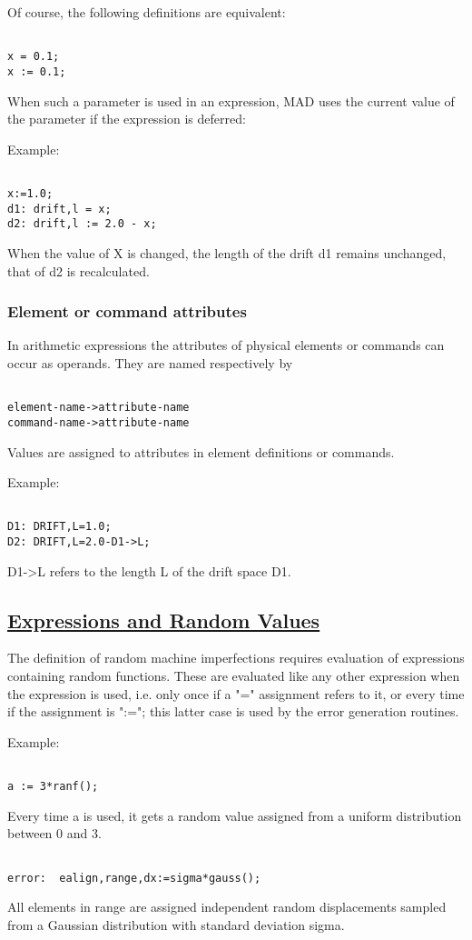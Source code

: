 Of course, the following definitions are equivalent:  
\begin{verbatim}

x = 0.1;
x := 0.1;
\end{verbatim}

When such a parameter is used in an expression, MAD uses the current
value of the parameter if the expression is deferred:  

Example: 
\begin{verbatim}

x:=1.0;
d1: drift,l = x;
d2: drift,l := 2.0 - x;
\end{verbatim} 
When the value of X is changed, the length of the drift d1 remains
unchanged, that of d2 is recalculated.   

\subsubsection{Element or command attributes} 
In arithmetic expressions the attributes of physical elements or
commands can occur as operands. They are named respectively by  
\begin{verbatim}

element-name->attribute-name
command-name->attribute-name
\end{verbatim} 

Values are assigned to attributes in element definitions or commands. 

Example: 
\begin{verbatim}

D1: DRIFT,L=1.0;
D2: DRIFT,L=2.0-D1->L;
\end{verbatim} 
D1-\textgreater L refers to the length L of the drift space D1.  

\subsection{\href{defer}{Expressions and Random Values}} 
The definition of random machine imperfections requires evaluation of
expressions containing random functions. These are evaluated like any
other expression when the expression is used, i.e. only once if a "="
assignment refers to it, or every time if the assignment is ":="; this
latter case is used by the error generation routines.  

Example: 
\begin{verbatim}

a := 3*ranf();
\end{verbatim} 
Every time a is used, it gets a random value assigned from a uniform
distribution between 0 and 3.  

\begin{verbatim}

error:  ealign,range,dx:=sigma*gauss();
\end{verbatim} 
All elements in range are assigned independent random displacements
sampled from a Gaussian distribution with standard deviation sigma.  


